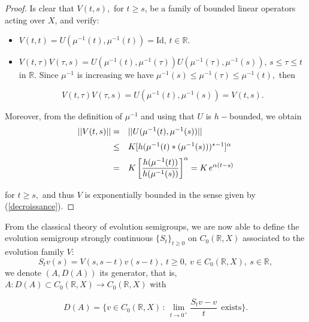 \documentclass[10pt]{amsart}
\numberwithin{equation}{section}
\begin{document}
\begin{proof}
Is clear that $V(t,s),$ for $t \ge s$, be a family of bounded linear operators acting over $X$, and verify:
\begin{itemize}
    \item $V(t,t) = U(\mu^{-1}(t), \mu^{-1} (t)) = \mathrm{Id}, \, t \in \mathbb{R}.$
\medskip

\item $V(t,\tau) V(\tau,s) = U(\mu^{-1}(t), \mu^{-1} (\tau)) U(\mu^{-1}(\tau), \mu^{-1} (s)), \, s \le \tau \le t$ in $\mathbb{R}.$ Since $\mu^{-1}$ is increasing we have $\mu^{-1}(s) \le\mu^{-1}(\tau) \le \mu^{-1}(t),$ then 

$$V(t,\tau) V(\tau,s) = U(\mu^{-1}(t), \mu^{-1} (s)) = V(t,s).$$
    \end{itemize}

    Moreover, from the definition of $\mu^{-1}$ and using that $U$ is $h-$bounded,  we obtain
    $$
    \begin{array}{rl}
    \medskip
    ||V(t,s)||  = &  ||U(\mu^{-1}(t), \mu^{-1} (s))|| \\
    \medskip
     \le  & K [h(\mu^{-1}(t)* (\mu^{-1}(s)))^{*-1}]^\alpha \\
     \medskip
     = & K \displaystyle \left[ \frac{h(\mu^{-1}(t))}{h(\mu^{-1}(s))}\right]^\alpha = K \, e^{\alpha(t -s)}
    \end{array}
    $$
\noindent for  $t \ge s,$ and thus $V$ is exponentially bounded in the sense given by (\ref{decroissance}).   
\end{proof}

From the classical theory of evolution semigroups, we are now able to define the evolution semigroup strongly continuous $\{S_t\}_{t \ge 0}$ on $C_0(\mathbb{R}, X)$ associated to the evolution family $V$:
$$
S_tv(s) = V(s,s-t) v(s-t), \ t \ge 0, \ v \in  C_0(\mathbb{R}, X), \ s \in \mathbb{R},
$$
we denote $(A,D(A))$ its generator, that is,  $A: D(A) \subset C_0(\mathbb{R}, X) \to C_0(\mathbb{R}, X)$ with 

\begin{equation*}
D(A) = \{v \in C_0(\mathbb{R}, X)\, : \, \lim_{t \to 0^+} \frac{S_t v - v}{t}  \ \ \mbox{exists}\}.
\end{equation*}

\noindent 
\end{document}
